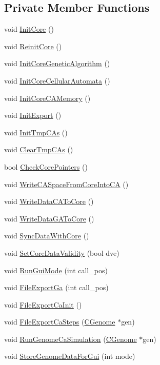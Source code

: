 \subsection*{Private Member Functions}
\begin{DoxyCompactItemize}
\item 
void \hyperlink{classCThreadCore_a585fd3734edc146086bc42187fd56bc6}{InitCore} ()
\item 
void \hyperlink{classCThreadCore_a6d63012cb404af5d7b18017d8299a603}{ReinitCore} ()
\item 
void \hyperlink{classCThreadCore_ad0bfe748e42ad65bbe82df1070c8c95e}{InitCoreGeneticAlgorithm} ()
\item 
void \hyperlink{classCThreadCore_a1dc7525d74dba3c1fa0a94057596c0a2}{InitCoreCellularAutomata} ()
\item 
void \hyperlink{classCThreadCore_a6cc4724d18c05cd2d06833c986cc569d}{InitCoreCAMemory} ()
\item 
void \hyperlink{classCThreadCore_abde63c16350bd57c9ecc539195a84e91}{InitExport} ()
\item 
void \hyperlink{classCThreadCore_a4e710409fd00cd204c837db052506879}{InitTmpCAs} ()
\item 
void \hyperlink{classCThreadCore_a6a70230547c401faba79d362df341bae}{ClearTmpCAs} ()
\item 
bool \hyperlink{classCThreadCore_a27d1fd877a64e906a250898a36aeb730}{CheckCorePointers} ()
\item 
void \hyperlink{classCThreadCore_af979f38a80787229941f03512e003c09}{WriteCASpaceFromCoreIntoCA} ()
\item 
void \hyperlink{classCThreadCore_a427dd34ccf958e15f9b9754ca4b21088}{WriteDataCAToCore} ()
\item 
void \hyperlink{classCThreadCore_a533ca5b498cbe0395dedd01e1646c973}{WriteDataGAToCore} ()
\item 
void \hyperlink{classCThreadCore_a4fff3c00394bcaffae4875a7fb28a335}{SyncDataWithCore} ()
\item 
void \hyperlink{classCThreadCore_a780fc802d644b0e4d992558df2f27c5d}{SetCoreDataValidity} (bool dve)
\item 
void \hyperlink{classCThreadCore_a597d1ee93090b677f89f3ac6005e8561}{RunGuiMode} (int call\_\-pos)
\item 
void \hyperlink{classCThreadCore_ad76c05c9748da357d926c66a52fecfdc}{FileExportGa} (int call\_\-pos)
\item 
void \hyperlink{classCThreadCore_a8a25b573f3189377f4f34b75a65dd063}{FileExportCaInit} ()
\item 
void \hyperlink{classCThreadCore_a25cbacbf0e0c79aab05aee3a41a1043f}{FileExportCaSteps} (\hyperlink{classCGenome}{CGenome} $\ast$gen)
\item 
void \hyperlink{classCThreadCore_a73af8250e870e24d41f99f7e576fb466}{RunGenomeCaSimulation} (\hyperlink{classCGenome}{CGenome} $\ast$gen)
\item 
void \hyperlink{classCThreadCore_aecc92d11204f96cd0c658cdc3b925f58}{StoreGenomeDataForGui} (int mode)
\end{DoxyCompactItemize}
